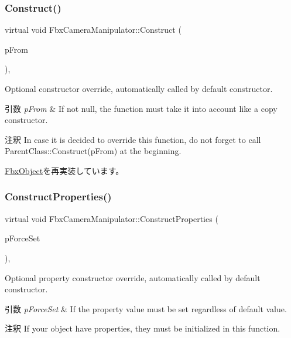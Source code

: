\subsubsection{\texorpdfstring{Construct()}{Construct()}}
{\footnotesize\ttfamily virtual void Fbx\+Camera\+Manipulator\+::\+Construct (\begin{DoxyParamCaption}\item[{const \hyperlink{class_fbx_object}{Fbx\+Object} $\ast$}]{p\+From }\end{DoxyParamCaption})\hspace{0.3cm}{\ttfamily [protected]}, {\ttfamily [virtual]}}

Optional constructor override, automatically called by default constructor. 
\begin{DoxyParams}{引数}
{\em p\+From} & If not null, the function must take it into account like a copy constructor. \\
\hline
\end{DoxyParams}
\begin{DoxyRemark}{注釈}
In case it is decided to override this function, do not forget to call Parent\+Class\+::\+Construct(p\+From) at the beginning. 
\end{DoxyRemark}


\hyperlink{class_fbx_object_a313503bc645af3fdceb4a99ef5cea7eb}{Fbx\+Object}を再実装しています。

\mbox{\label{class_fbx_camera_manipulator_a9e97c5d7f153bbc80a2c233d425a447f}} 
\subsubsection{\texorpdfstring{Construct\+Properties()}{ConstructProperties()}}
{\footnotesize\ttfamily virtual void Fbx\+Camera\+Manipulator\+::\+Construct\+Properties (\begin{DoxyParamCaption}\item[{bool}]{p\+Force\+Set }\end{DoxyParamCaption})\hspace{0.3cm}{\ttfamily [protected]}, {\ttfamily [virtual]}}

Optional property constructor override, automatically called by default constructor. 
\begin{DoxyParams}{引数}
{\em p\+Force\+Set} & If the property value must be set regardless of default value. \\
\hline
\end{DoxyParams}
\begin{DoxyRemark}{注釈}
If your object have properties, they must be initialized in this function. 
\end{DoxyRemark}


